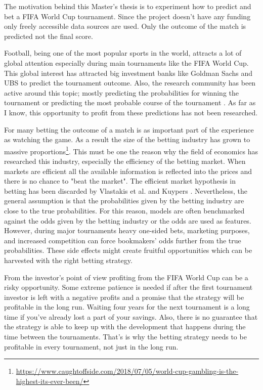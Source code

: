The motivation behind this Master's thesis is to experiment how to predict and bet a FIFA World Cup tournament. Since the project doesn't have any funding only freely accessible data sources are used. Only the outcome of the match is predicted not the final score.

Football, being one of the most popular sports in the world, attracts a lot of global attention especially during main tournaments like the FIFA World Cup. This global interest has attracted big investment banks like Goldman Sachs and UBS to predict the tournament outcome. Also, the research community has been active around this topic; mostly predicting the probabilities for winning the tournament or predicting the most probable course of the tournament \cite{groll2018prediction, groll2015prediction, leitner2010forecasting}. As far as I know, this opportunity to profit from these predictions has not been researched.

For many betting the outcome of a match is as important part of the experience as watching the game. As a result the size of the betting industry has grown to massive proportions\footnote{\url{https://www.caughtoffside.com/2018/07/05/world-cup-gambling-is-the-highest-its-ever-been/}}. This must be one the reason why the field of economics has researched this industry, especially the efficiency of the betting market. When markets are efficient all the available information is reflected into the prices and there is no chance to "beat the market". The efficient market hypothesis in betting has been discarded by Vlastakis et al. \cite{vlastakis2009efficient} and Kuypers \cite{kuypers2008}. Nevertheless, the general assumption is that the probabilities given by the betting industry are close to the true probabilities. For this reason, models are often benchmarked against the odds given by the betting industry or the odds are used as features. \cite{leitner2010forecasting} However, during major tournaments heavy one-sided bets, marketing purposes, and increased competition can force bookmakers' odds further from the true probabilities. These side effects might create fruitful opportunities which can be harvested with the right betting strategy.

From the investor's point of view profiting from the FIFA World Cup can be a risky opportunity. Some extreme patience is needed if after the first tournament investor is left with a negative profits and a promise that the strategy will be profitable in the long run. Waiting four years for the next tournament is a long time if you've already lost a part of your savings. Also, there is no guarantee that the strategy is able to keep up with the development that happens during the time between the tournaments. That's is why the betting strategy needs to be profitable in every tournament, not just in the long run.

